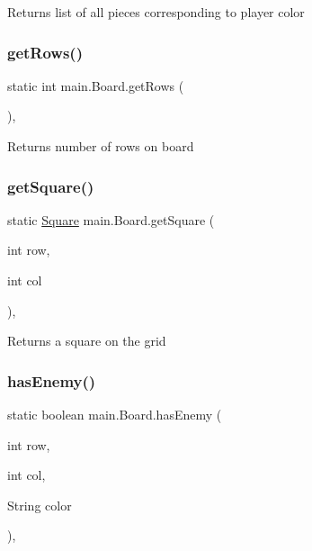 Returns list of all pieces corresponding to player color \mbox{\label{classmain_1_1_board_a59eccdf158ef8bcc6524a33363d0e529}} 
\subsubsection{\texorpdfstring{get\+Rows()}{getRows()}}
{\footnotesize\ttfamily static int main.\+Board.\+get\+Rows (\begin{DoxyParamCaption}{ }\end{DoxyParamCaption})\hspace{0.3cm}{\ttfamily [inline]}, {\ttfamily [static]}}

Returns number of rows on board \mbox{\label{classmain_1_1_board_a90e5f578ea61f42aa870d413176e1734}} 
\subsubsection{\texorpdfstring{get\+Square()}{getSquare()}}
{\footnotesize\ttfamily static \hyperlink{classmain_1_1_square}{Square} main.\+Board.\+get\+Square (\begin{DoxyParamCaption}\item[{int}]{row,  }\item[{int}]{col }\end{DoxyParamCaption})\hspace{0.3cm}{\ttfamily [inline]}, {\ttfamily [static]}}

Returns a square on the grid \mbox{\label{classmain_1_1_board_ade0a0da2dc83ac4bc025a2bdd42259fa}} 
\subsubsection{\texorpdfstring{has\+Enemy()}{hasEnemy()}}
{\footnotesize\ttfamily static boolean main.\+Board.\+has\+Enemy (\begin{DoxyParamCaption}\item[{int}]{row,  }\item[{int}]{col,  }\item[{String}]{color }\end{DoxyParamCaption})\hspace{0.3cm}{\ttfamily [inline]}, {\ttfamily [static]}}

